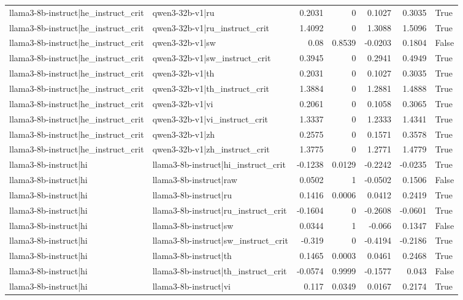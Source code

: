 \begin{table}
\begin{tabular}{l l r r r r l}
llama3-8b-instruct|he_instruct_crit & qwen3-32b-v1|ru & 0.2031 & 0 & 0.1027 & 0.3035 & True \\
llama3-8b-instruct|he_instruct_crit & qwen3-32b-v1|ru_instruct_crit & 1.4092 & 0 & 1.3088 & 1.5096 & True \\
llama3-8b-instruct|he_instruct_crit & qwen3-32b-v1|sw & 0.08 & 0.8539 & -0.0203 & 0.1804 & False \\
llama3-8b-instruct|he_instruct_crit & qwen3-32b-v1|sw_instruct_crit & 0.3945 & 0 & 0.2941 & 0.4949 & True \\
llama3-8b-instruct|he_instruct_crit & qwen3-32b-v1|th & 0.2031 & 0 & 0.1027 & 0.3035 & True \\
llama3-8b-instruct|he_instruct_crit & qwen3-32b-v1|th_instruct_crit & 1.3884 & 0 & 1.2881 & 1.4888 & True \\
llama3-8b-instruct|he_instruct_crit & qwen3-32b-v1|vi & 0.2061 & 0 & 0.1058 & 0.3065 & True \\
llama3-8b-instruct|he_instruct_crit & qwen3-32b-v1|vi_instruct_crit & 1.3337 & 0 & 1.2333 & 1.4341 & True \\
llama3-8b-instruct|he_instruct_crit & qwen3-32b-v1|zh & 0.2575 & 0 & 0.1571 & 0.3578 & True \\
llama3-8b-instruct|he_instruct_crit & qwen3-32b-v1|zh_instruct_crit & 1.3775 & 0 & 1.2771 & 1.4779 & True \\
llama3-8b-instruct|hi & llama3-8b-instruct|hi_instruct_crit & -0.1238 & 0.0129 & -0.2242 & -0.0235 & True \\
llama3-8b-instruct|hi & llama3-8b-instruct|raw & 0.0502 & 1 & -0.0502 & 0.1506 & False \\
llama3-8b-instruct|hi & llama3-8b-instruct|ru & 0.1416 & 0.0006 & 0.0412 & 0.2419 & True \\
llama3-8b-instruct|hi & llama3-8b-instruct|ru_instruct_crit & -0.1604 & 0 & -0.2608 & -0.0601 & True \\
llama3-8b-instruct|hi & llama3-8b-instruct|sw & 0.0344 & 1 & -0.066 & 0.1347 & False \\
llama3-8b-instruct|hi & llama3-8b-instruct|sw_instruct_crit & -0.319 & 0 & -0.4194 & -0.2186 & True \\
llama3-8b-instruct|hi & llama3-8b-instruct|th & 0.1465 & 0.0003 & 0.0461 & 0.2468 & True \\
llama3-8b-instruct|hi & llama3-8b-instruct|th_instruct_crit & -0.0574 & 0.9999 & -0.1577 & 0.043 & False \\
llama3-8b-instruct|hi & llama3-8b-instruct|vi & 0.117 & 0.0349 & 0.0167 & 0.2174 & True \\

\end{tabular}
\end{table}
